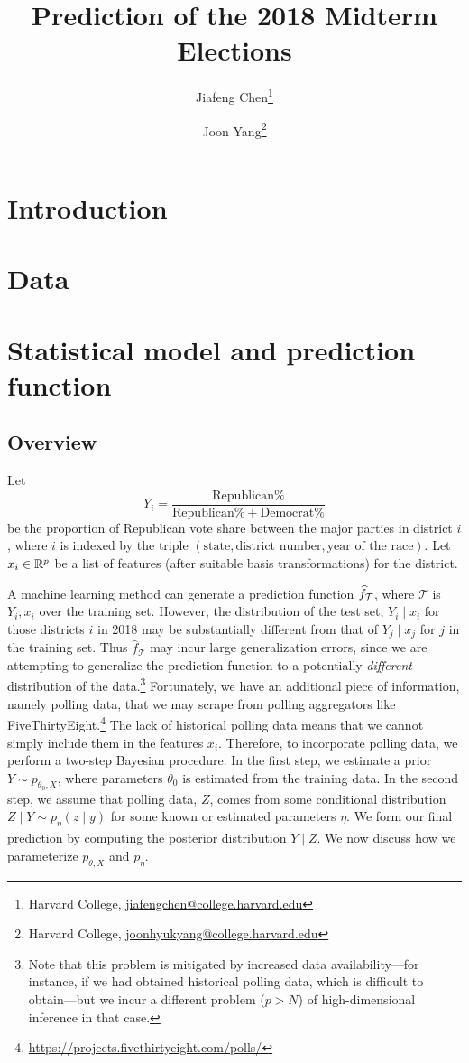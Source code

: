 \documentclass[11pt]{article}
\title{Prediction of the 2018 Midterm Elections}
\author{Jiafeng Chen\thanks{Harvard College, \url{jiafengchen@college.harvard.edu}} \and Joon Yang\thanks{Harvard College, \url{joonhyukyang@college.harvard.edu}}}
\begin{document}
\maketitle
\section{Introduction}

\section{Data}

\section{Statistical model and prediction function}
\subsection{Overview}
Let \[Y_i = \frac{\text{Republican}\% }{\text{Republican}\% + \text{Democrat}\%}\] be the proportion of Republican vote share between the major parties in district $i$, where $i$ is indexed by the triple $(\text{state}, \text{district number}, \text{year of the race})$.
Let $x_i\in \R^p$ be a list of features (after suitable basis transformations)
for the district. 

A machine learning method can generate a prediction function $\hat f_{\cal T}$,
where $\mathcal T$ is $Y_i, x_i$ over the training set. However, the
distribution of the test set, $Y_i \mid x_i$ for those districts $i$ in 2018 may
be
substantially different from that of $Y_j \mid x_j$ for $j$ in the training
set. Thus $\hat f_{\mathcal T}$ may incur large generalization errors, since we
are attempting to generalize the prediction function to a potentially 
\emph{different}
distribution
of the data.\footnote{Note that this problem is mitigated by increased data
availability---for instance, if we had obtained historical polling data,
which is difficult to obtain---but we incur a different problem ($p > N$) of
high-dimensional
inference in that case.} Fortunately, we have an additional piece of
information, namely polling data, that we may scrape from polling aggregators
like
FiveThirtyEight.\footnote{\url{https://projects.fivethirtyeight.com/polls/}} The
lack of historical polling data means that we cannot simply include them in the
features $x_i$. Therefore, to incorporate polling data, we perform a two-step
Bayesian procedure. In the first step, we estimate a prior $Y \sim p_{\theta_0,
X}$, where parameters $\theta_0$ is estimated from the training data. In the
second step, we assume that polling data, $Z$, comes from some conditional
distribution $Z \mid Y \sim p_{\eta}(z\mid y)$ for some known or
estimated parameters
$\eta$. We form our final prediction by computing the posterior distribution $Y
\mid Z$. We now discuss how we parameterize $p_{\theta, X}$ and $p_\eta$.
\end{document}
